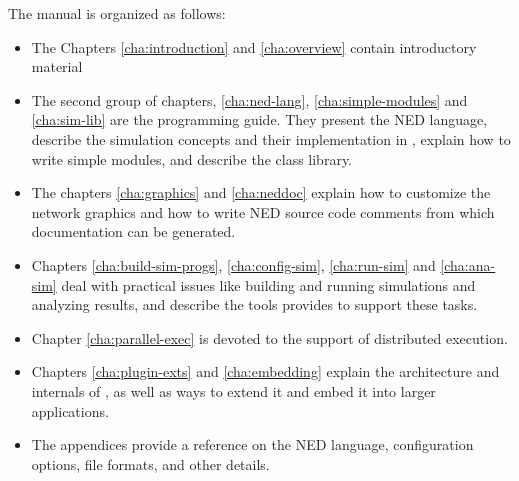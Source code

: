 The manual is organized as follows:

\begin{itemize}
  \item{The Chapters \ref{cha:introduction} and \ref{cha:overview}
    contain introductory material}
  \item{The second group of chapters,
    \ref{cha:ned-lang},
    \ref{cha:simple-modules} and
    \ref{cha:sim-lib}
    are the programming guide. They present the NED language,
    describe the simulation concepts and their implementation in {\opp}, explain
    how to write simple modules, and describe the class library.}
  \item{The chapters \ref{cha:graphics} and \ref{cha:neddoc}
    explain how to customize
    the network graphics and how to write NED source code comments
    from which documentation can be generated.}
  \item{Chapters \ref{cha:build-sim-progs},
    \ref{cha:config-sim}, \ref{cha:run-sim} and
    \ref{cha:ana-sim} deal with practical issues
    like building and running simulations and analyzing results, and
    describe the tools {\opp} provides to support these tasks.}
  \item{Chapter \ref{cha:parallel-exec} is devoted to the support
    of distributed execution.}
  \item{Chapters \ref{cha:plugin-exts} and \ref{cha:embedding}
    explain the architecture and internals of {\opp}, as well as
    ways to extend it and embed it into larger applications.}
  \item{The appendices provide a reference on the NED language,
    configuration options, file formats, and other details.}
\end{itemize}


%
%


